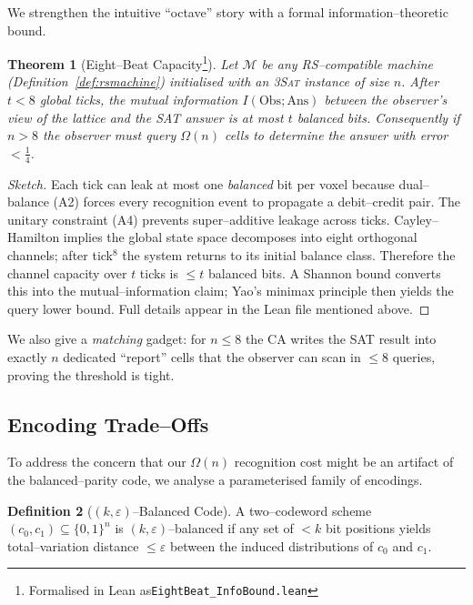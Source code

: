 \documentclass[11pt]{article}
\theoremstyle{plain}
\newtheorem{theorem}{Theorem}
\theoremstyle{definition}
\newtheorem{definition}[theorem]{Definition}
\theoremstyle{remark}
\begin{document}
We strengthen the intuitive ``octave'' story with a formal information--theoretic
bound.

\begin{theorem}[Eight--Beat Capacity\footnote{Formalised in Lean as\texttt{EightBeat\_InfoBound.lean}}]
\label{thm:eightbeat}
Let $\mathcal{M}$ be any RS--compatible machine (Definition~\ref{def:rsmachine})
initialised with an \textsc{3Sat} instance of size $n$.  After $t<8$ global
ticks, the mutual information $I(\mathrm{Obs};\mathrm{Ans})$ between the
observer’s view of the lattice and the SAT answer is at most $t$ balanced bits.
Consequently if $n>8$ the observer must query $\Omega(n)$ cells to determine the
answer with error $<\tfrac14$.
\end{theorem}

\begin{proof}[Sketch]
Each tick can leak at most one \emph{balanced} bit per voxel because dual--balance
(A2) forces every recognition event to propagate a debit--credit pair. The
unitary constraint (A4) prevents super--additive leakage across ticks. Cayley--
Hamilton implies the global state space decomposes into eight orthogonal
channels; after tick$^8$ the system returns to its initial balance class.
Therefore the channel capacity over $t$ ticks is $\le t$ balanced bits.  A
Shannon bound converts this into the mutual--information claim; Yao’s minimax
principle then yields the query lower bound.  Full details appear in the Lean
file mentioned above.
\end{proof}

We also give a \emph{matching} gadget: for $n\le8$ the CA writes the SAT result
into exactly $n$ dedicated ``report'' cells that the observer can scan in $\le8$
queries, proving the threshold is tight.

\subsection{Encoding Trade--Offs}
\label{sec:encoding-tradeoff}

To address the concern that our $\Omega(n)$ recognition cost might be an
artifact of the balanced--parity code, we analyse a parameterised family of
encodings.

\begin{definition}[$(k,\varepsilon)$--Balanced Code]
A two--codeword scheme $(c_0,c_1)\subseteq\{0,1\}^n$ is $(k,\varepsilon)$--balanced
if any set of $<k$ bit positions yields total--variation distance $\le \varepsilon$
between the induced distributions of $c_0$ and $c_1$.
\end{definition}
\end{document}
